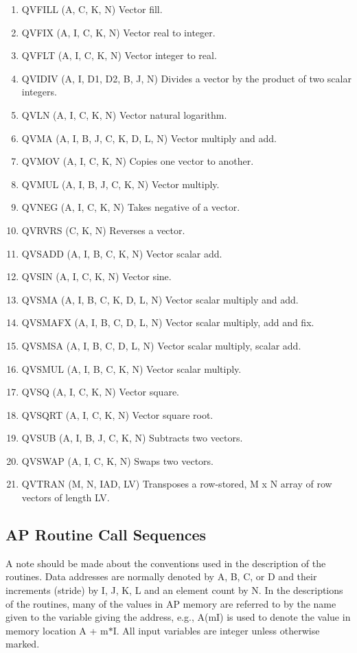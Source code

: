 \begin{enumerate}
\item QVFILL (A, C, K, N) Vector fill.
\item QVFIX (A, I, C, K, N) Vector real to integer.
\item QVFLT (A, I, C, K, N) Vector integer to real.
\item QVIDIV (A, I, D1, D2, B, J, N) Divides a vector by the product of two
scalar integers.
\item QVLN (A, I, C, K, N) Vector natural logarithm.
\item QVMA (A, I, B, J, C, K, D, L, N) Vector multiply and add.
\item QVMOV (A, I, C, K, N) Copies one vector to another.
\item QVMUL  (A, I, B, J, C, K, N) Vector multiply.
\item QVNEG (A, I, C, K, N) Takes negative of a vector.
\item QVRVRS (C, K, N) Reverses a vector.
\item QVSADD (A, I, B, C, K, N) Vector scalar add.
\item QVSIN (A, I, C, K, N) Vector sine.
\item QVSMA (A, I, B, C, K, D, L, N) Vector scalar multiply and add.
\item QVSMAFX (A, I, B, C, D, L, N) Vector scalar multiply, add and fix.
\item QVSMSA (A, I, B, C, D, L, N) Vector scalar multiply, scalar add.
\item QVSMUL (A, I, B, C, K, N) Vector scalar multiply.
\item QVSQ (A, I, C, K, N) Vector square.
\item QVSQRT (A, I, C, K, N) Vector square root.
\item QVSUB (A, I, B, J, C, K, N) Subtracts two vectors.
\item QVSWAP (A, I, C, K, N) Swaps two vectors.
\item QVTRAN (M, N, IAD, LV) Transposes a row-stored, M x N array of row
vectors of length LV.

\end{enumerate} %

\subsection{AP Routine Call Sequences }
A note should be made about the conventions used in the description of
the routines.  Data addresses are normally denoted by A, B, C, or D
and their increments (stride) by I, J, K, L and an element count by N.
In the descriptions of the routines, many of the values in AP memory
are referred to by the name given to the variable giving the address,
e.g., A(mI) is used to denote the value in memory location A + m$\ast$I.
All input variables are integer unless otherwise marked.

